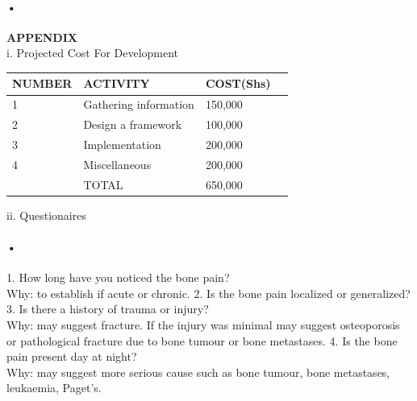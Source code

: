 \documentclass[12pt]{article}
\begin{document}
\paragraph{•}\textbf{APPENDIX}
\\i. Projected Cost For Development

\begin{center}
\begin{tabular}{|l|l|l|c|}
\hline NUMBER  & ACTIVITY & COST(Shs) \\\hline

1 & Gathering information & 150,000 \\\hline
2 & Design a framework & 100,000\\\hline
3 &Implementation & 200,000 \\\hline
4 & Miscellaneous & 200,000\\\hline
  & TOTAL & 650,000\\\hline
\end{tabular}
\end{center}

 ii. Questionaires

\paragraph{•}1. How long have you noticed the bone pain?
\\Why: to establish if acute or chronic.
2. Is the bone pain localized or generalized?
3. Is there a history of trauma or injury?
\\Why: may suggest fracture. If the injury was minimal may suggest osteoporosis or pathological fracture due to bone tumour or bone metastases.
4. Is the bone pain present day at night?
\\Why: may suggest more serious cause such as bone tumour, bone metastases, leukaemia, Paget's.
\end{document}
